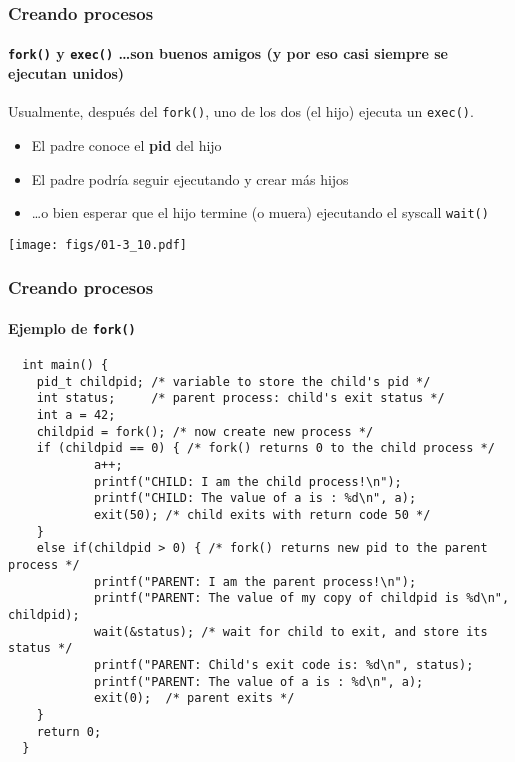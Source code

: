 \documentclass[letter]{beamer}
\begin{document}
\begin{frame}
  \frametitle{Creando procesos}
  \framesubtitle{{\tt fork()} y {\tt exec()} \ldots son buenos amigos (y por eso casi siempre se ejecutan unidos)}

  Usualmente, después del {\tt fork()}, uno de los dos (el hijo) ejecuta un {\tt exec()}.

  \begin{itemize}
    \item El padre conoce el {\bf pid} del hijo
    \item El padre podría seguir ejecutando y crear más hijos
    \item \ldots o bien esperar que el hijo termine (o muera) ejecutando el syscall {\tt wait()}
  \end{itemize}

  \begin{center}
    \texttt{[image: figs/01-3\_10.pdf]}
  \end{center}
  

\end{frame}

\begin{frame}[fragile]
  \frametitle{Creando procesos}
  \framesubtitle{Ejemplo de {\tt fork()}}

\begin{verbatim}
  int main() {
    pid_t childpid; /* variable to store the child's pid */
    int status;     /* parent process: child's exit status */
    int a = 42;
    childpid = fork(); /* now create new process */
    if (childpid == 0) { /* fork() returns 0 to the child process */
            a++;
            printf("CHILD: I am the child process!\n");
            printf("CHILD: The value of a is : %d\n", a);
            exit(50); /* child exits with return code 50 */
    }
    else if(childpid > 0) { /* fork() returns new pid to the parent process */
            printf("PARENT: I am the parent process!\n");
            printf("PARENT: The value of my copy of childpid is %d\n", childpid);
            wait(&status); /* wait for child to exit, and store its status */
            printf("PARENT: Child's exit code is: %d\n", status);
            printf("PARENT: The value of a is : %d\n", a);
            exit(0);  /* parent exits */
    }
    return 0;
  }
\end{verbatim}

\end{frame}
\end{document}
